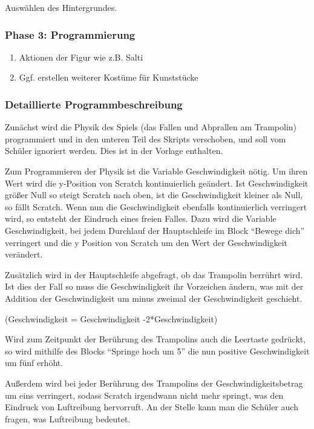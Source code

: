 Auswählen des Hintergrundes.

\subsubsection{Phase 3: Programmierung}\label{phase-3-programmierung}

\begin{enumerate}
\item
  Aktionen der Figur wie z.B. Salti
\item
  Ggf. erstellen weiterer Kostüme für Kunststücke
\end{enumerate}

\subsubsection{Detaillierte
Programmbeschreibung}\label{detaillierte-programmbeschreibung}

Zunächst wird die Physik des Spiels (das Fallen und Abprallen am
Trampolin) programmiert und in den unteren Teil des Skripts verschoben,
und soll vom Schüler ignoriert werden. Dies ist in der Vorlage
enthalten.

Zum Programmieren der Physik ist die Variable Geschwindigkeit nötig. Um
ihren Wert wird die y-Position von Scratch kontinuierlich geändert. Ist
Geschwindigkeit größer Null so steigt Scratch nach oben, ist die
Geschwindigkeit kleiner als Null, so fällt Scratch. Wenn nun die
Geschwindigkeit ebenfalls kontinuierlich verringert wird, so entsteht
der Eindruch eines freien Falles. Dazu wird die Variable
Geschwindigkeit, bei jedem Durchlauf der Hauptschleife im Block ``Bewege
dich'' verringert und die y Position von Scratch um den Wert der
Geschwindigkeit verändert.

Zusätzlich wird in der Hauptschleife abgefragt, ob das Trampolin
berrührt wird. Ist dies der Fall so muss die Geschwindigkeit ihr
Vorzeichen ändern, was mit der Addition der Geschwindigkeit um minus
zweimal der Geschwindigkeit geschieht.

(Geschwindigkeit = Geschwindigkeit -2*Geschwindigkeit)

Wird zum Zeitpunkt der Berührung des Trampolins auch die Leertaste
gedrückt, so wird mithilfe des Blocks ``Springe hoch um 5'' die nun
positive Geschwindigkeit um fünf erhöht.

Außerdem wird bei jeder Berührung des Trampolins der
Geschwindigkeitsbetrag um eins verringert, sodass Scratch irgendwann
nicht mehr springt, was den Eindruck von Luftreibung hervorruft. An der
Stelle kann man die Schüler auch fragen, was Luftreibung bedeutet.

